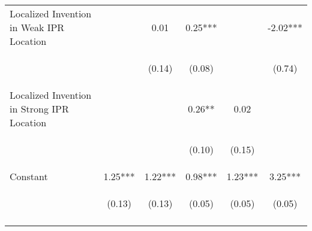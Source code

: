 \begin{center}
\begin{tabular}{lccccc}
Localized Invention in Weak IPR Location &  & 0.01 & 0.25*** &  & -2.02*** \\
\vspace{4pt} & \begin{footnotesize}\end{footnotesize} & \begin{footnotesize}(0.14)\end{footnotesize} & \begin{footnotesize}(0.08)\end{footnotesize} & \begin{footnotesize}\end{footnotesize} & \begin{footnotesize}(0.74)\end{footnotesize} \\
Localized Invention in Strong IPR Location &  &  & 0.26** & 0.02 &  \\
\vspace{4pt} & \begin{footnotesize}\end{footnotesize} & \begin{footnotesize}\end{footnotesize} & \begin{footnotesize}(0.10)\end{footnotesize} & \begin{footnotesize}(0.15)\end{footnotesize} & \begin{footnotesize}\end{footnotesize} \\
Constant & 1.25*** & 1.22*** & 0.98*** & 1.23*** & 3.25*** \\
 & \begin{footnotesize}(0.13)\end{footnotesize} & \begin{footnotesize}(0.13)\end{footnotesize} & \begin{footnotesize}(0.05)\end{footnotesize} & \begin{footnotesize}(0.05)\end{footnotesize} & \begin{footnotesize}(0.05)\end{footnotesize} \\
\vspace{4pt} & \begin{footnotesize}\end{footnotesize} & \begin{footnotesize}\end{footnotesize} & \begin{footnotesize}\end{footnotesize} & \begin{footnotesize}\end{footnotesize} & \begin{footnotesize}\end{footnotesize} \\

\end{tabular}
\end{center}
